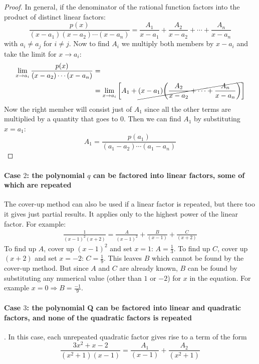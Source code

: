 \documentclass[12pt, letterpaper]{article}
\theoremstyle{definition}
\DeclarePairedDelimiter\autobracket{(}{)}
\newcommand{\br}[1]{\autobracket*{#1}}
\let\tb\textbf
\begin{document}
\begin{proof}
In general, if the denominator of the rational function factors into the product of distinct linear factors:
\begin{equation}
\frac{p(x)}{(x-a_1) (x-a_2)\cdots (x-a_n)} = \frac{A_1}{x-a_1} + \frac{A_2}{x-a_2} + \cdots+ \frac{A_n}{x-a_n} 
\end{equation}
with $a_i \ne a_j$ for $i\ne j$.
Now to find $A_i$ we multiply both members by $x-a_i$ and take the limit for $x\rightarrow a_i$:
\begin{equation}
\begin{aligned}
\lim_{x\rightarrow a_i}\frac{p(x)}{(x-a_2)\cdots(x-a_n)} &= \\
&= \lim_{x\rightarrow a_i} \left[A_1 + \cancel{(x-a_1) \br{\frac{A_2}{x-a_2} + \cdots+ \frac{A_n}{x-a_n} }}\right]
\end{aligned}
\end{equation}
Now the right member will consist just of $A_1$ since all the other terms are multiplied by a quantity that goes to $0$. Then we can find $A_1$  by substituting $x=a_1$:
\begin{equation}
A_1 = \frac{p(a_1)}{(a_1-a_2)\cdots(a_1-a_n)}
\end{equation}
\end{proof}

\paragraph{\tb{Case $2$}: the polynomial $q$ can be factored into linear factors, some of which are repeated}
The cover-up method can also be used if a linear factor is repeated, but there too it gives just partial results. It applies only to the highest power of the linear factor. For example:
\begin{equation}
\begin{aligned}
\frac{1}{(x-1)^2(x+2)} = \frac{A}{(x-1)^2}  +\frac{B}{(x-1)}  +\frac{C}{(x+2)}
\end{aligned}
\end{equation}
To find up $A$, cover up $(x-1)^2$ and set $x=1$: $A=\frac{1}{3}$.  To find up $C$, cover up $(x+2)$ and set $x=-2$: $C=\frac{1}{9}$. This leaves $B$ which cannot be found by the cover-up method. But since $A$ and $C$ are already known, $B$ can be found by substituting any numerical value (other than $1$ or $-2$) for $x$ in the equation. For example $x=0 \Rightarrow B=\frac{-1}{9}$.

\paragraph{\tb{Case $3$:} the polynomial Q can be factored into linear and quadratic factors, and none of the quadratic factors is repeated}. In this case, each unrepeated quadratic factor gives rise to a term of the form
\begin{equation}
\frac{3x^2+x-2}{(x^2+1)(x-1)} = \frac{A_1}{(x-1)}+\frac{A_2}{(x^2+1)}
\end{equation}
\end{document}
